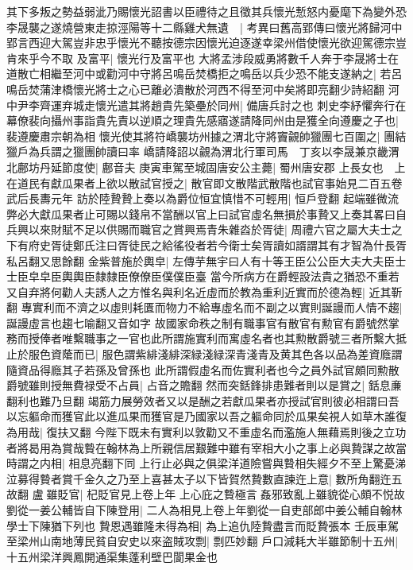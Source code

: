 其下多叛之勢益弱泚乃賜懷光詔書以臣禮待之且徵其兵懷光慙怒内憂麾下為變外恐李晟襲之遂燒營東走掠涇陽等十二縣雞犬無遺　|{
	考異曰舊高郢傳曰懷光將歸河中郢言西迎大駕豈非忠乎懷光不聽按德宗因懷光迫逐遂幸梁州借使懷光欲迎駕德宗豈肯來乎今不取}
及富平|{
	懷光行及富平也}
大將孟涉段威勇將數千人奔于李晟將士在道散亡相繼至河中或勸河中守將呂鳴岳焚橋拒之鳴岳以兵少恐不能支遂納之|{
	若呂鳴岳焚蒲津橋懷光將士之心已離必潰散於河西不得至河中矣將即亮翻少詩紹翻}
河中尹李齊運弃城走懷光遣其將趙貴先築壘於同州|{
	備唐兵討之也}
刺史李紓懼奔行在幕僚裴向攝州事詣貴先責以逆順之理貴先感寤遂請降同州由是獲全向遵慶之子也|{
	裴遵慶肅宗朝為相}
懷光使其將符嶠襲坊州據之渭北守將竇覦帥獵團七百圍之|{
	團結獵戶為兵謂之獵團帥讀曰率}
嶠請降詔以覦為渭北行軍司馬　丁亥以李晟兼京畿渭北鄜坊丹延節度使|{
	鄜音夫}
庚寅車駕至城固唐安公主薨|{
	蜀州唐安郡}
上長女也　上在道民有獻瓜果者上欲以散試官授之|{
	散官即文散階武散階也試官事始見二百五卷武后長夀元年}
訪於陸贄贄上奏以為爵位恒宜慎惜不可輕用|{
	恒戶登翻}
起端雖微流弊必大獻瓜果者止可賜以錢帛不當酬以官上曰試官虛名無損於事贄又上奏其畧曰自兵興以來財賦不足以供賜而職官之賞興焉青朱雜㳫於胥徒|{
	周禮六官之屬大夫士之下有府史胥徒鄭氏注曰胥徒民之給徭役者若今衛士矣胥讀如諝謂其有才智為什長胥私呂翻又思餘翻}
金紫普施於輿皁|{
	左傳芋無宇曰人有十等王臣公公臣大夫大夫臣士士臣皁皁臣輿輿臣隸隸臣僚僚臣僕僕臣臺}
當今所病方在爵輕設法貴之猶恐不重若又自弃將何勸人夫誘人之方惟名與利名近虛而於教為重利近實而於德為輕|{
	近其靳翻}
專實利而不濟之以虛則耗匱而物力不給專虛名而不副之以實則誕謾而人情不趨|{
	誕謾虛言也趨七喻翻又音如字}
故國家命秩之制有職事官有散官有勲官有爵號然掌務而授俸者唯繫職事之一官也此所謂施實利而寓虛名者也其勲散爵號三者所繫大抵止於服色資䕃而已|{
	服色謂紫緋淺緋深緑淺緑深青淺青及黄其色各以品為差資廕謂隨資品得廕其子若孫及曾孫也}
此所謂假虛名而佐實利者也今之員外試官頗同勲散爵號雖則授無費禄受不占員|{
	占音之贍翻}
然而突銛鋒排患難者則以是賞之|{
	銛息亷翻利也難乃旦翻}
竭筋力展勞效者又以是酬之若獻瓜果者亦授試官則彼必相謂曰吾以忘軀命而獲官此以進瓜果而獲官是乃國家以吾之軀命同於瓜果矣視人如草木誰復為用哉|{
	復扶又翻}
今陛下既未有實利以敦勸又不重虛名而濫施人無藉焉則後之立功者將曷用為賞哉䞇在翰林為上所親信居艱難中雖有宰相大小之事上必與贄謀之故當時謂之内相|{
	相息亮翻下同}
上行止必與之俱梁洋道險嘗與䞇相失經夕不至上驚憂涕泣募得䞇者賞千金久之乃至上喜甚太子以下皆賀然贄數直諫迕上意|{
	數所角翻迕五故翻}
盧雖貶官|{
	杞貶官見上卷上年}
上心庇之䞇極言姦邪致亂上雖貌從心頗不悦故劉從一姜公輔皆自下陳登用|{
	二人為相見上卷上年劉從一自吏部郎中姜公輔自翰林學士下陳猶下列也}
贄恩遇雖隆未得為相|{
	為上追仇陸贄盡言而貶贄張本}
壬辰車駕至梁州山南地薄民貧自安史以來盗賊攻剽|{
	剽匹妙翻}
戶口減耗大半雖節制十五州|{
	十五州梁洋興鳳開通渠集蓬利壁巴閬果金也}
